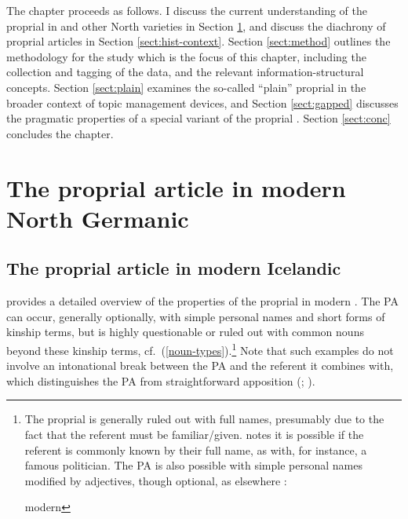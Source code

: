 \documentclass[output=paper,colorlinks,citecolor=brown]{langscibook}
\begin{document}
The chapter proceeds as follows. I discuss the current understanding of the proprial  in  and other North  varieties in Section \ref{sect:bg}, and discuss the diachrony of proprial articles in Section \ref{sect:hist-context}. Section \ref{sect:method} outlines the methodology for the  study which is the focus of this chapter, including the collection and tagging of the data, and the relevant information-structural concepts.  Section \ref{sect:plain} examines the so-called ``plain'' proprial  \citep{Sigurdsson2006} in the broader context of topic management devices, and Section \ref{sect:gapped} discusses the pragmatic properties of a special variant of the proprial . Section \ref{sect:conc} concludes the chapter.

\section{The proprial article in modern North Germanic}\label{sect:bg}

\subsection{The proprial article in modern Icelandic}\largerpage

\citet{Sigurdsson2006} provides a detailed overview of the properties of the proprial  in modern . The PA can occur, generally optionally, with simple personal names and short forms of kinship terms, but is highly questionable or ruled out with common nouns beyond these kinship terms, cf.~(\ref{noun-types}).{\footnote{The proprial  is generally ruled out with full names, presumably due to the fact that the referent must be familiar/given. \citet[225]{Sigurdsson2006} notes it is possible if the referent is commonly known by their full name, as with, for instance, a famous politician.
The PA is also possible with simple personal names modified by adjectives, though optional, as elsewhere \citep[134]{delsing1993internal}: 

\ea \label{name-adj} modern 
 \z 
\z}} Note that such examples do not involve an intonational break between the PA and the referent it combines with, which distinguishes the PA from straightforward apposition (\citealp{Sigurdsson2006}; \citealp{Wood2009}).
\end{document}
